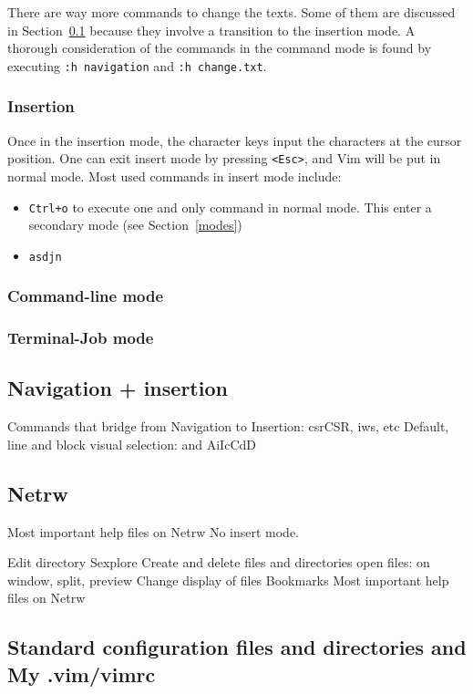 \documentclass{article}
\begin{document}
There are way more commands to change the texts.
Some of them are discussed in Section~\ref{navIn}
because they involve a transition to the insertion mode.
A thorough consideration of the commands in the command mode
is found by executing \texttt{:h navigation} and 
\texttt{:h change.txt}.

\subsubsection{Insertion}
Once in the insertion mode, the character keys
input the characters at the cursor position.
One can exit insert mode by pressing \texttt{<Esc>},
and Vim will be put in normal mode.
Most used commands in insert mode include:
\begin{itemize}
  \item \texttt{Ctrl+o} to execute one and only command in normal mode.
	  This enter a secondary mode (see Section~\ref{modes})
  \item \texttt{asdjn}
\end{itemize}


\subsubsection{Command-line mode}

\subsubsection{Terminal-Job mode}\label{terminal}

\subsection{Navigation + insertion}\label{navIn}
Commands that bridge from Navigation to Insertion:
csrCSR, iws, etc
Default, line and block visual selection:
  and AiIcCdD

\subsection{Netrw}
Most important help files on Netrw
No insert mode.

Edit directory
Sexplore
Create and delete files and directories
open files: on window, split, preview
Change display of files
Bookmarks
Most important help files on Netrw


\subsection{Standard configuration files and directories and My .vim/vimrc}
\end{document}

